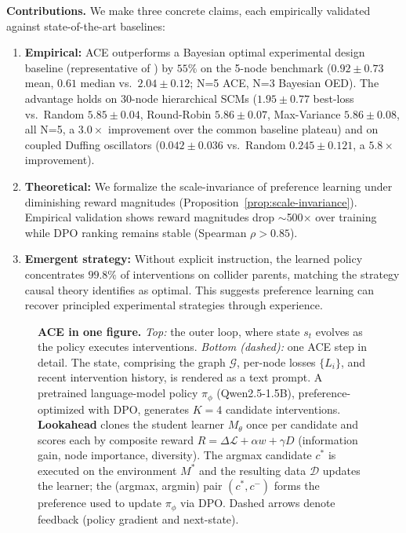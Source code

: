 \documentclass{article}
\theoremstyle{plain}
\theoremstyle{definition}
\theoremstyle{remark}
\begin{document}
\textbf{Contributions.} We make three concrete claims, each empirically validated against state-of-the-art baselines:
\begin{enumerate}[leftmargin=1.5em,topsep=0.2em,itemsep=0.1em]
\item \textbf{Empirical:} ACE outperforms a Bayesian optimal experimental design baseline (representative of \citep{toth2022active,tigas2022interventions}) by $55\%$ on the 5-node benchmark ($0.92\pm0.73$ mean, $0.61$ median vs.\ $2.04\pm0.12$; N=5 ACE, N=3 Bayesian OED). The advantage holds on 30-node hierarchical SCMs ($1.95\pm0.77$ best-loss vs.\ Random $5.85\pm0.04$, Round-Robin $5.86\pm0.07$, Max-Variance $5.86\pm0.08$, all N=5, a $3.0\times$ improvement over the common baseline plateau) and on coupled Duffing oscillators ($0.042\pm0.036$ vs.\ Random $0.245\pm0.121$, a $5.8\times$ improvement).
\item \textbf{Theoretical:} We formalize the scale-invariance of preference learning under diminishing reward magnitudes (Proposition~\ref{prop:scale-invariance}). Empirical validation shows reward magnitudes drop $\sim$500$\times$ over training while DPO ranking remains stable (Spearman $\rho > 0.85$).
\item \textbf{Emergent strategy:} Without explicit instruction, the learned policy concentrates $99.8\%$ of interventions on collider parents, matching the strategy causal theory identifies as optimal. This suggests preference learning can recover principled experimental strategies through experience.
\end{enumerate}

\begin{figure}[t]
\centering

\caption{\textbf{ACE in one figure.} \emph{Top:} the outer loop, where state $s_t$ evolves as the policy executes interventions. \emph{Bottom (dashed):} one ACE step in detail. The state, comprising the graph $\mathcal{G}$, per-node losses $\{L_i\}$, and recent intervention history, is rendered as a text prompt. A pretrained language-model policy $\pi_\phi$ (Qwen2.5-1.5B), preference-optimized with DPO, generates $K{=}4$ candidate interventions. \textbf{Lookahead} clones the student learner $M_\theta$ once per candidate and scores each by composite reward $R = \Delta\mathcal{L} + \alpha w + \gamma D$ (information gain, node importance, diversity). The argmax candidate $c^{*}$ is executed on the environment $M^{*}$ and the resulting data $\mathcal{D}$ updates the learner; the (argmax, argmin) pair $(c^{*}, c^{-})$ forms the preference used to update $\pi_\phi$ via DPO. Dashed arrows denote feedback (policy gradient and next-state).}
\label{fig:framework}
\end{figure}
\end{document}
